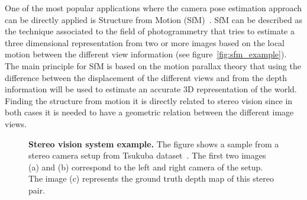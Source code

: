 One of the most popular applications where the camera pose estimation approach can be directly applied is Structure from Motion (SfM)~\cite{ullman1979}. SfM can be described as the technique associated to the field of photogrammetry that tries to estimate a three dimensional representation from two or more images based on the local motion between the different view information (see figure~\ref{fig:sfm_example}). The main principle for SfM is based on the motion parallax theory that using the difference between the displacement of the different views and from the depth information will be used to estimate an accurate 3D representation of the world. Finding the structure from motion it is directly related to stereo vision since in both cases it is needed to have a geometric relation between the different image views.

\begin{figure}
    \centering
    \caption[Stereo vision system example]{\textbf{Stereo vision system example.} The figure shows a sample from a stereo camera setup from Tsukuba dataset~\cite{PerisMMOF12}. The first two images (a) and (b) correspond to the left and right camera of the setup. The image (c) represents the ground truth depth map of this stereo pair.}
    \label{fig:stereo_example}
\end{figure}

